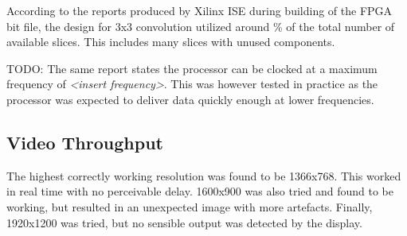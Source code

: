 According to the reports produced by Xilinx ISE during building of the FPGA bit file, the design for 3x3 convolution utilized around \unit[16]{\%} of the total number of available slices.
    This includes many slices with unused components.

    TODO:
    The same report states the processor can be clocked at a maximum frequency of \emph{<insert frequency>}. This was however tested in practice as the processor was expected to deliver data quickly enough at lower frequencies.

    \subsection{Video Throughput}
    The highest correctly working resolution was found to be 1366x768. This worked in real time with no perceivable delay. 1600x900 was also tried and found to be working, but resulted in an unexpected image with more artefacts. Finally, 1920x1200 was tried, but no sensible output was detected by the display.

